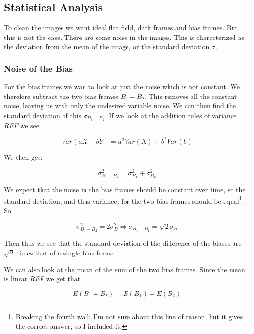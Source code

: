 \documentclass{emulateapj}
\begin{document}
\subsection{Statistical Analysis}
To clean the images we want ideal flat field, dark frames and bias frames. But this is not the case. There are some noise in the images. This is characterized as the deviation from the mean of the image, or the standard deviation $\sigma$.

\subsubsection{Noise of the Bias}
\label{sec:noiseBias}
For the bias frames we wan to look at just the noise which is not constant. We therefore subtract the two bias frames $B_1 - B_2$. This removes all the constant noise, leaving us with only the undesired variable noise. We can then find the standard deviation of this $\sigma_{B_1 - B_2}$. If we look at the addition rules of variance \emph{REF} we see

\begin{equation}
Var(aX - bY) = a^2Var(X) + b^2Var(b)
\end{equation}

We then get:

\begin{equation}
\sigma_{B_1 - B_2}^2 = \sigma_{B_1}^2 + \sigma_{B_2}^2
\end{equation}

We expect that the noise in the bias frames should be constant over time, so the standard deviation, and thus variance, for the two bias frames should be equal\footnote{Breaking the fourth wall: I'm not sure about this line of reason, but it gives the correct answer, so I included it.}. So

\begin{equation}
\sigma_{B_1 - B_2}^2 = 2\sigma_{B}^2 \Rightarrow \sigma_{B_1 - B_2} = \sqrt{2}\sigma_B
\label{eq:stdB1B2}
\end{equation}

Then thus we see that the standard deviation of the difference of the biases are $\sqrt{2}$ times that of a single bias frame.

We can also look at the mean of the sum of the two bias frames. Since the mean is linear \emph{REF} we get that

\begin{equation}
E(B_1 + B_2) = E(B_1) + E(B_2)
\label{eq:meanB}
\end{equation}
\end{document}
